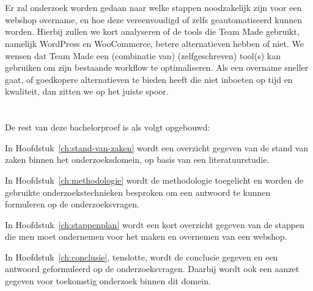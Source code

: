 \section{}%
\label{sec:onderzoeksdoelstelling}


Er zal onderzoek worden gedaan naar welke stappen noodzakelijk zijn voor een webshop overname, en hoe deze vereenvoudigd of zelfs geautomatiseerd kunnen worden. Hierbij zullen we kort analyseren of de tools die Team Made gebruikt, namelijk WordPress en WooCommerce, betere alternatieven hebben of niet. We wensen dat Team Made een (combinatie van) (zelfgeschreven) tool(s) kan gebruiken om zijn bestaande workflow te optimaliseren. Als een overname sneller gaat, of goedkopere alternatieven te bieden heeft die niet inboeten op tijd en kwaliteit, dan zitten we op het juiste spoor.

\section{}%
\label{sec:opzet-bachelorproef}


De rest van deze bachelorproef is als volgt opgebouwd:

In Hoofdstuk~\ref{ch:stand-van-zaken} wordt een overzicht gegeven van de stand van zaken binnen het onderzoeksdomein, op basis van een literatuurstudie.

In Hoofdstuk~\ref{ch:methodologie} wordt de methodologie toegelicht en worden de gebruikte onderzoekstechnieken besproken om een antwoord te kunnen formuleren op de onderzoeksvragen.

In Hoofdstuk~\ref{ch:stappenplan} wordt een kort overzicht gegeven van de stappen die men moet ondernemen voor het maken en overnemen van een webshop.

In Hoofdstuk~\ref{ch:conclusie}, tenslotte, wordt de conclusie gegeven en een antwoord geformuleerd op de onderzoeksvragen. Daarbij wordt ook een aanzet gegeven voor toekomstig onderzoek binnen dit domein.
